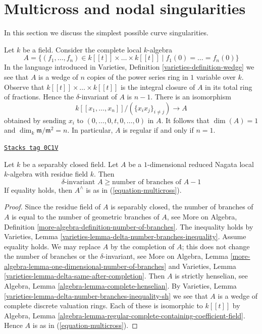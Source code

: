 \section{Multicross and nodal singularities}
\label{curves-section-multicross}
In this section we discuss the simplest possible curve singularities.

\medskip\noindent
Let $k$ be a field. Consider the complete local $k$-algebra
\begin{equation}
\label{equation-multicross}
A = \{(f_1, \ldots, f_n) \in k[[t]] \times \ldots \times k[[t]] \mid
f_1(0) = \ldots = f_n(0)\}
\end{equation}
In the language introduced in
Varieties, Definition \ref{varieties-definition-wedge}
we see that $A$ is a wedge of $n$ copies of the power series
ring in $1$ variable over $k$. Observe that
$k[[t]] \times \ldots \times k[[t]]$
is the integral closure of $A$ in its total ring of fractions.
Hence the $\delta$-invariant of $A$ is $n - 1$.
There is an isomorphism
$$
k[[x_1, \ldots, x_n]]/(\{x_ix_j\}_{i \not = j}) \longrightarrow A
$$
obtained by sending $x_i$ to $(0, \ldots, 0, t, 0, \ldots, 0)$
in $A$. It follows that $\dim(A) = 1$ and
$\dim_k \mathfrak m/\mathfrak m^2 = n$.
In particular, $A$ is regular if and only if $n = 1$.

\begin{lemma}
\label{curves-lemma-multicross-algebra}
\href{https://stacks.math.columbia.edu/tag/0C1V}{\texttt{Stacks tag 0C1V}}

Let $k$ be a separably closed field. Let $A$ be a $1$-dimensional
reduced Nagata local $k$-algebra with residue field $k$. Then
$$
\delta\text{-invariant }A \geq \text{number of branches of }A - 1
$$
If equality holds, then $A^\wedge$ is as in (\ref{equation-multicross}).
\end{lemma}

\begin{proof}
Since the residue field of $A$ is separably closed, the number
of branches of $A$ is equal to the number of geometric branches
of $A$, see
More on Algebra, Definition \ref{more-algebra-definition-number-of-branches}.
The inequality holds by
Varieties, Lemma \ref{varieties-lemma-delta-number-branches-inequality}.
Assume equality holds.
We may replace $A$ by the completion of $A$; this does
not change the number of branches or the $\delta$-invariant, see
More on Algebra, Lemma
\ref{more-algebra-lemma-one-dimensional-number-of-branches}
and Varieties, Lemma \ref{varieties-lemma-delta-same-after-completion}.
Then $A$ is strictly henselian, see
Algebra, Lemma \ref{algebra-lemma-complete-henselian}.
By Varieties, Lemma \ref{varieties-lemma-delta-number-branches-inequality-sh}
we see that $A$ is a wedge of complete discrete valuation rings.
Each of these is isomorphic to $k[[t]]$ by Algebra, Lemma
\ref{algebra-lemma-regular-complete-containing-coefficient-field}.
Hence $A$ is as in (\ref{equation-multicross}).
\end{proof}

